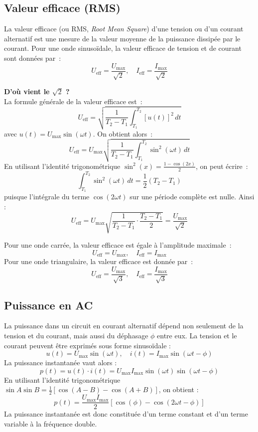 \subsection{Valeur efficace (RMS)}
La valeur efficace (ou RMS, \emph{Root Mean Square}) d'une tension ou d'un courant alternatif est une mesure de la valeur moyenne de la puissance dissip\'ee par le courant.
Pour une onde sinuso\"idale, la valeur efficace de tension et de courant sont donn\'ees par~:
\[
U_{\text{eff}} = \frac{U_{\text{max}}}{\sqrt{2}}, \quad I_{\text{eff}} = \frac{I_{\text{max}}}{\sqrt{2}}
\]
\begin{Note}{\textbf{D'où vient le $\sqrt{2}$ ?}}\\
La formule g\'en\'erale de la valeur efficace est~:
\[
U_{\text{eff}} = \sqrt{\frac{1}{T_2 - T_1} \int_{T_1}^{T_2} [u(t)]^2 \, dt}
\]
avec \( u(t) = U_{\text{max}}\sin(\omega t) \). On obtient alors~:
\[
U_{\text{eff}} = U_{\text{max}} \sqrt{\frac{1}{T_2 - T_1} \int_{T_1}^{T_2} \sin^2(\omega t)\, dt}
\]
En utilisant l'identit\'e trigonom\'etrique $\sin^2(x) = \frac{1 - \cos(2x)}{2}$, on peut \'ecrire~:
\[
\int_{T_1}^{T_2} \sin^2(\omega t)\, dt = \frac{1}{2}(T_2 - T_1)
\]
puisque l’int\'egrale du terme $\cos(2\omega t)$ sur une p\'eriode compl\`ete est nulle.
Ainsi :
\[
U_{\text{eff}} = U_{\text{max}} \sqrt{\frac{1}{T_2 - T_1} \cdot \frac{T_2 - T_1}{2}} = \frac{U_{\text{max}}}{\sqrt{2}}
\]
\end{Note}
Pour une onde carr\'ee, la valeur efficace est \'egale à l'amplitude maximale~:
\[U_{\text{eff}} = U_{\text{max}}, \quad I_{\text{eff}} = I_{\text{max}}\]
Pour une onde triangulaire, la valeur efficace est donn\'ee par~:
\[U_{\text{eff}} = \frac{U_{\text{max}}}{\sqrt{3}}, \quad I_{\text{eff}} = \frac{I_{\text{max}}}{\sqrt{3}}\]


\subsection{Puissance en AC}
La puissance dans un circuit en courant alternatif d\'epend non seulement de la tension et du courant, mais aussi du d\'ephasage $\phi$ entre eux.
La tension et le courant peuvent être exprim\'es sous forme sinuso\"idale :
\[
u(t) = U_{\text{max}} \sin(\omega t), \quad i(t) = I_{\text{max}} \sin(\omega t - \phi)
\]
La puissance instantan\'ee vaut alors :
\[
p(t) = u(t) \cdot i(t) = U_{\text{max}} I_{\text{max}} \sin(\omega t)\sin(\omega t - \phi)
\]
En utilisant l'identit\'e trigonom\'etrique $\sin A \sin B = \tfrac{1}{2}[\cos(A - B) - \cos(A + B)]$, on obtient :
\[
p(t) = \frac{U_{\text{max}} I_{\text{max}}}{2} [\cos(\phi) - \cos(2\omega t - \phi)]
\]
La puissance instantan\'ee est donc constitu\'ee d’un terme constant et d’un terme variable à la fr\'equence double.

